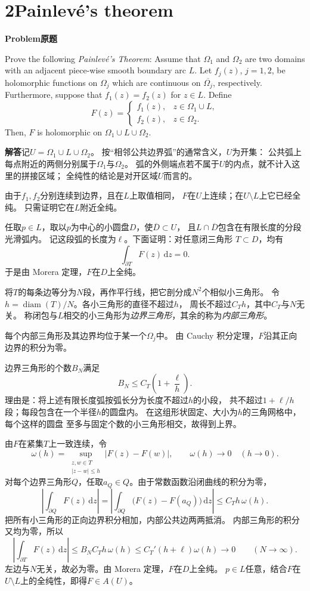 \documentclass[11pt,a4paper]{ctexart}
\newcommand{\dd}{\,\mathrm d}
\newcommand{\problem}{\par\textbf{Problem\quad 原题}\par}
\newcommand{\solution}{\par\medskip\textbf{解答}\quad}
\begin{document}
\newpage
\section*{2\quad Painlevé's theorem}
\problem
Prove the following \emph{Painlevé's Theorem}: Assume that $\Omega_1$ and $\Omega_2$
are two domains with an adjacent piece-wise smooth boundary arc $L$.
Let $f_j(z)$, $j=1,2$, be holomorphic functions on $\Omega_j$ which are continuous
on $\overline{\Omega_j}$, respectively.
Furthermore, suppose that $f_1(z)=f_2(z)$ for $z\in L$. Define
\[
 F(z)=
 \begin{cases}
  f_1(z),&z\in\Omega_1\cup L,\\
  f_2(z),&z\in\Omega_2.
 \end{cases}
\]
Then, $F$ is holomorphic on $\Omega_1\cup L\cup\Omega_2$.

\solution 记$U=\Omega_1\cup L\cup\Omega_2$。
按“相邻公共边界弧”的通常含义，$U$为开集：
公共弧上每点附近的两侧分别属于$\Omega_1$与$\Omega_2$。
弧的外侧端点若不属于$U$的内点，就不计入这里的拼接区域；
全纯性的结论是对开区域$U$而言的。

由于$f_1,f_2$分别连续到边界，且在$L$上取值相同，
$F$在$U$上连续；在$U\setminus L$上它已经全纯。
只需证明它在$L$附近全纯。

任取$p\in L$，取以$p$为中心的小圆盘$D$，使$\overline D\subset U$，
且$L\cap\overline D$包含在有限长度的分段光滑弧内。
记这段弧的长度为$\ell$。下面证明：对任意闭三角形
$T\subset D$，均有
\[
 \int_{\partial T}F(z)\dd z=0.
\]
于是由 Morera 定理，$F$在$D$上全纯。

将$T$的每条边等分为$N$段，再作平行线，把它剖分成$N^2$个相似小三角形。
令$h=\operatorname{diam}(T)/N$。各小三角形的直径不超过$h$，
周长不超过$C_T h$，其中$C_T$与$N$无关。
称闭包与$L$相交的小三角形为\emph{边界三角形}，其余的称为\emph{内部三角形}。

每个内部三角形及其边界均位于某一个$\Omega_j$中。
由 Cauchy 积分定理，$F$沿其正向边界的积分为零。

边界三角形的个数$B_N$满足
\[
 B_N\le C_T\left(1+\frac{\ell}{h}\right).
\]
理由是：将上述有限长度弧按弧长分为长度不超过$h$的小段，
共不超过$1+\ell/h$段；每段包含在一个半径$h$的圆盘内。
在这组形状固定、大小为$h$的三角网格中，每个这样的圆盘
至多与固定个数的小三角形相交，故得到上界。

由$F$在紧集$T$上一致连续，令
\[
 \omega(h)=
 \sup_{\substack{z,w\in T\\|z-w|\le h}}|F(z)-F(w)|,
 \qquad \omega(h)\longrightarrow0\quad(h\to0).
\]
对每个边界三角形$Q$，任取$a_Q\in Q$。由于常数函数沿闭曲线的积分为零，
\[
 \left|\int_{\partial Q}F(z)\dd z\right|
 =\left|\int_{\partial Q}\bigl(F(z)-F(a_Q)\bigr)\dd z\right|
 \le C_T h\,\omega(h).
\]
把所有小三角形的正向边界积分相加，内部公共边两两抵消。
内部三角形的积分又均为零，所以
\[
 \left|\int_{\partial T}F(z)\dd z\right|
 \le B_N C_T h\,\omega(h)
 \le C_T'(h+\ell)\omega(h)\longrightarrow0
 \qquad(N\to\infty).
\]
左边与$N$无关，故必为零。由 Morera 定理，$F$在$D$上全纯。
$p\in L$任意，结合$F$在$U\setminus L$上的全纯性，即得$F\in A(U)$。
\end{document}
